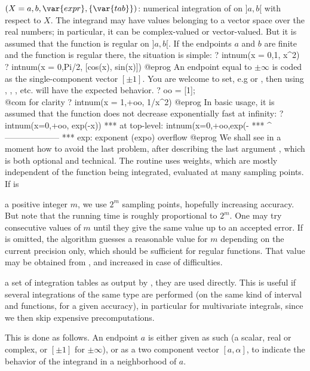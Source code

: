 $(X=a,b,\var{expr},\{\var{tab}\})$: \label{se:intnum}numerical integration
of  on $]a,b[$ with respect to $X$. The integrand may have values
belonging to a vector space over the real numbers; in particular, it can be
complex-valued or vector-valued. But it is assumed that the function is regular
on $]a,b[$. If the endpoints $a$ and $b$ are finite and the function is regular
there, the situation is simple:
\bprog
? intnum(x = 0,1, x^2)
? intnum(x = 0,Pi/2, [cos(x), sin(x)])
@eprog\noindent
An endpoint equal to $\pm\infty$ is coded as the single-component vector
$[\pm1]$. You are welcome to set, e.g  or ,
then using , , , etc. will have the expected
behavior.
\bprog
? oo = [1];  \\@com for clarity
? intnum(x = 1,+oo, 1/x^2)
@eprog\noindent
In basic usage, it is assumed that the function does not decrease
exponentially fast at infinity:
\bprog
? intnum(x=0,+oo, exp(-x))
  ***   at top-level: intnum(x=0,+oo,exp(-
  ***                 ^--------------------
  *** exp: exponent (expo) overflow
@eprog\noindent
We shall see in a moment how to avoid the last problem, after describing
the last argument , which is both optional and technical. The
routine uses weights, which are mostly independent of the function being
integrated, evaluated at many sampling points. If  is

\item a positive integer $m$, we use $2^m$ sampling points, hopefully
increasing accuracy. But note that the running time is roughly proportional
to $2^m$. One may try consecutive values of $m$ until they give the same
value up to an accepted error. If  is omitted, the algorithm guesses
a reasonable value for $m$ depending on the current precision only, which
should be sufficient for regular functions. That value may be obtained from
, and increased in case of difficulties.

\item a set of integration tables as output by ,
they are used directly. This is useful if several integrations of the same
type are performed (on the same kind of interval and functions, for a given
accuracy), in particular for multivariate integrals, since we then skip
expensive precomputations.

This is done as follows. An endpoint $a$ is either given as such (a scalar,
real or complex, or $[\pm1]$ for $\pm\infty$), or as a two component vector
$[a,\alpha]$, to indicate the behavior of the integrand in a neighborhood
of $a$.

